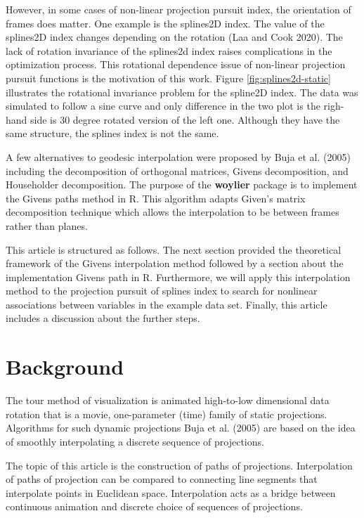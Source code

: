 However, in some cases of non-linear projection pursuit index, the orientation of frames does matter. One example is the splines2D index. The value of the splines2D index changes depending on the rotation (Laa and Cook 2020). The lack of rotation invariance of the splines2d index raises complications in the optimization process. This rotational dependence issue of non-linear projection pursuit functions is the motivation of this work. Figure \ref{fig:splines2d-static} illustrates the rotational invariance problem for the spline2D index. The data was simulated to follow a sine curve and only difference in the two plot is the righ-hand side is 30 degree rotated version of the left one. Although they have the same structure, the splines index is not the same.

A few alternatives to geodesic interpolation were proposed by Buja et al. (2005) including the decomposition of orthogonal matrices, Givens decomposition, and Householder decomposition. The purpose of the \textbf{woylier} package is to implement the Givens paths method in R. This algorithm adapts Given's matrix decomposition technique which allows the interpolation to be between frames rather than planes.

This article is structured as follows. The next section provided the theoretical framework of the Givens interpolation method followed by a section about the implementation Givens path in R. Furthermore, we will apply this interpolation method to the projection pursuit of splines index to search for nonlinear associations between variables in the example data set. Finally, this article includes a discussion about the further steps.

\hypertarget{background}{%
\section{Background}\label{background}}

The tour method of visualization is animated high-to-low dimensional data rotation that is a movie, one-parameter (time) family of static projections. Algorithms for such dynamic projections Buja et al. (2005) are based on the idea of smoothly interpolating a discrete sequence of projections.

The topic of this article is the construction of paths of projections. Interpolation of paths of projection can be compared to connecting line segments that interpolate points in Euclidean space. Interpolation acts as a bridge between continuous animation and discrete choice of sequences of projections.

